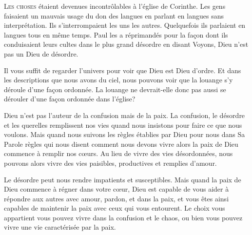 


\lettrine{L}{es choses} étaient devenues incontrôlables
 à l'église de Corinthe.
 Les gens faisaient un mauvais usage du don des langues
 en parlant en langues sans interprétation.
 Ils s'interrompaient les uns les autres.
 Quelquefois ils parlaient en langues tous en même temps.
 Paul les a réprimandés pour la fa\c{c}on dont ils conduisaient
 leurs cultes dans le plus grand désordre en disant\frcolon{} 
 \Og Voyons, Dieu n'est pas un Dieu de désordre. \Fg{}

Il vous suffit de regarder l'univers
 pour voir que Dieu est Dieu d'ordre.
 Et dans les descriptions que nous avons du ciel,
 nous pouvons voir que la louange s'y déroule d'une fa\c{c}on ordonnée.
 La louange ne devrait-elle donc pas aussi se dérouler
 d'une fa\c{c}on ordonnée dans l'église?


Dieu n'est pas l'auteur de la confusion mais de la paix.
 La confusion, le désordre et les querelles remplissent nos vies
 quand nous insistons pour faire ce que nous voulons.
 Mais quand nous suivons les règles établies par Dieu pour nous dans Sa Parole
 \ocadr règles qui nous disent comment nous devons vivre \fcadr{}
 alors la paix de Dieu commence à remplir nos c\oe{}urs.
 Au lieu de vivre des vies désordonnées,
 nous pouvons alors vivre des vies paisibles, productives et remplies d'amour.

Le désordre peut nous rendre impatients et susceptibles.
 Mais quand la paix de Dieu commence à régner dans votre c\oe{}ur,
 Dieu est capable de vous aider à répondre aux autres avec amour,
 pardon, et dans la paix, et vous êtes ainsi capables de maintenir
 la paix avec ceux qui vous entourent.
 Le choix vous appartient \ocadr vous pouvez vivre dans la confusion et le chaos,
 ou bien vous pouvez vivre une vie caractérisée par la paix.

\dvrule



